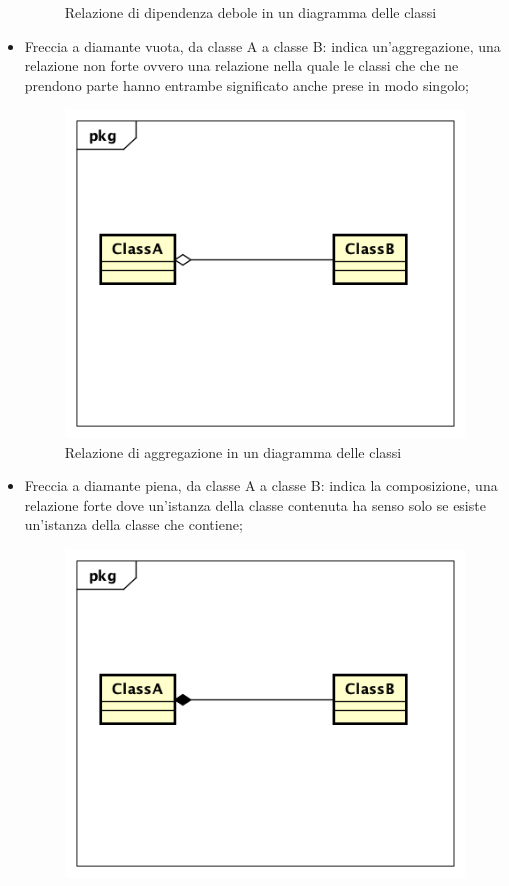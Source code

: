 \begin{itemize}
\begin{figure}[h]
		\caption{Relazione di dipendenza debole in un diagramma delle classi}\label{}
	\end{figure}
	\item Freccia a diamante vuota, da classe A a classe B: indica un'aggregazione, una relazione non forte ovvero una relazione nella quale le classi che che ne prendono parte hanno entrambe significato anche prese in modo singolo;
	\begin{figure}[h]
		\centering
		\includegraphics[scale=0.5]{images/Aggregazione.png}
		\caption{Relazione di aggregazione in un diagramma delle classi}\label{}
	\end{figure}
	\item Freccia a diamante piena, da classe A a classe B: indica la composizione, una relazione forte dove un'istanza della classe contenuta ha senso solo se esiste un'istanza della classe che contiene;
	\begin{figure}[h]
		\centering
		\includegraphics[scale=0.5]{images/Composizione.png}

\end{figure}
\end{itemize}
